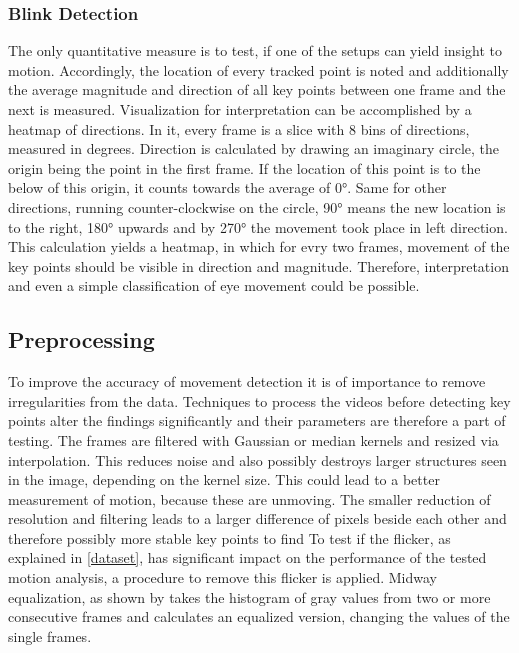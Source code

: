 \documentclass[Bachelorarbeit.tex]{subfiles}
\begin{document}
\subsubsection{Blink Detection}
The only quantitative measure is to test, if one of the setups can yield insight to motion. Accordingly, the location of every tracked point is noted and additionally the average magnitude and direction of all key points between one frame and the next is measured. Visualization for interpretation can be accomplished by a heatmap of directions. In it, every frame is a slice with 8 bins of directions, measured in degrees. Direction is calculated by drawing an imaginary circle, the origin being the point in the first frame. If the location of this point is to the below of this origin, it counts towards the average of 0°. Same for other directions, running counter-clockwise on the circle, 90° means the new location is to the right, 180° upwards and by 270° the movement took place in left direction.
This calculation yields a heatmap, in which for evry two frames, movement of the key points should be visible in direction and magnitude. Therefore, interpretation and even a simple classification of eye movement could be possible. 



\subsection{Preprocessing}
\label{preprocessing}
To improve the accuracy of movement detection it is of importance to remove irregularities from the data. Techniques to process the videos before detecting key points alter the findings significantly and their parameters are therefore a part of testing. The frames are filtered with Gaussian or median kernels and resized via interpolation. This reduces noise and also possibly destroys larger structures seen in the image, depending on the kernel size. This could lead to a better measurement of motion, because these are unmoving. The smaller reduction of resolution and filtering leads to a larger difference of pixels beside each other and therefore possibly more stable key points to find \citep[p. 2]{bouguet2001pyramidal}
To test if the flicker, as explained in \autoref{dataset}, has significant impact on the performance of the tested motion analysis, a procedure to remove this flicker is applied. Midway equalization, as shown by \cite{delon2004midway} takes the histogram of gray values from two or more consecutive frames and calculates an equalized version, changing the values of the single frames.  
\end{document}
